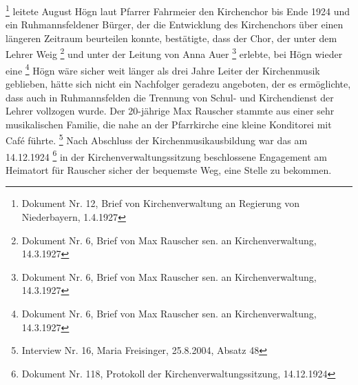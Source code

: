 \footnote{Dokument Nr. 12, Brief von Kirchenverwaltung an Regierung
von Niederbayern, 1.4.1927} leitete August Högn laut Pfarrer Fahrmeier
den Kirchenchor bis Ende 1924 und ein Ruhmannsfeldener Bürger, der die
Entwicklung des Kirchenchors über einen längeren Zeitraum beurteilen
konnte, bestätigte, dass der Chor, der unter dem Lehrer Weig
 \footnote{Dokument Nr. 6,
Brief von Max Rauscher sen. an Kirchenverwaltung, 14.3.1927} und unter
der Leitung von Anna Auer  \footnote{Dokument Nr. 6, Brief von Max Rauscher sen. an
Kirchenverwaltung, 14.3.1927} erlebte, bei Högn wieder eine
 \footnote{Dokument Nr. 6,
Brief von Max Rauscher sen. an Kirchenverwaltung, 14.3.1927} Högn wäre
sicher weit länger als drei Jahre Leiter der Kirchenmusik geblieben,
hätte sich nicht ein Nachfolger geradezu angeboten, der es ermöglichte,
dass auch in Ruhmannsfelden die Trennung von Schul- und Kirchendienst
der Lehrer vollzogen wurde. Der 20-jährige Max Rauscher stammte aus
einer sehr musikalischen Familie, die nahe an der Pfarrkirche eine
kleine Konditorei mit Café führte. \footnote{Interview Nr. 16, Maria
Freisinger, 25.8.2004, Absatz 48} Nach Abschluss der
Kirchenmusikausbildung war das am 14.12.1924 \footnote{Dokument Nr.
118, Protokoll der Kirchenverwaltungssitzung, 14.12.1924} in der
Kirchenverwaltungssitzung beschlossene Engagement am Heimatort für
Rauscher sicher der bequemste Weg, eine Stelle zu bekommen.

